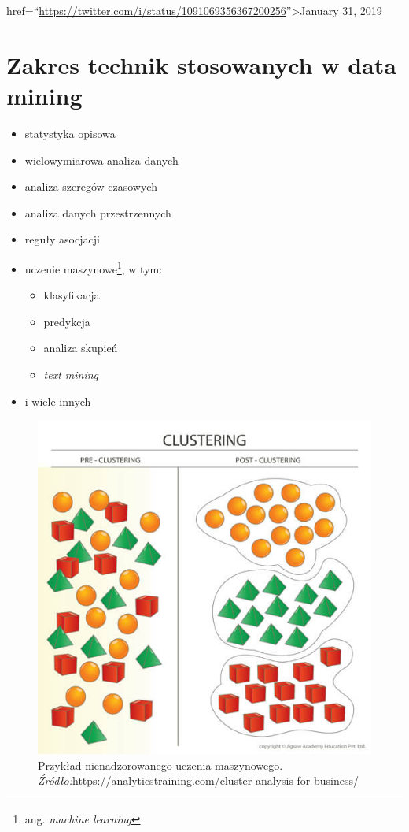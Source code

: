 \documentclass[]{book}
\providecommand{\tightlist}{%
  \setlength{\itemsep}{0pt}\setlength{\parskip}{0pt}}
\let\rmarkdownfootnote\footnote%
\def\footnote{\protect\rmarkdownfootnote}
\theoremstyle{plain}
\theoremstyle{definition}
\theoremstyle{definition}
\theoremstyle{definition}
\theoremstyle{definition}
\theoremstyle{remark}
\begin{document}
href=``\url{https://twitter.com/i/status/1091069356367200256}''\textgreater{}January 31, 2019

\hypertarget{zakres-technik-stosowanych-w-data-mining}{%
\section*{Zakres technik stosowanych w data mining}\label{zakres-technik-stosowanych-w-data-mining}}

\begin{itemize}
\tightlist
\item
  statystyka opisowa
\item
  wielowymiarowa analiza danych
\item
  analiza szeregów czasowych
\item
  analiza danych przestrzennych
\item
  reguły asocjacji
\item
  uczenie maszynowe\footnote{ang. \emph{machine learning}}, w tym:

  \begin{itemize}
  \tightlist
  \item
    klasyfikacja
  \item
    predykcja
  \item
    analiza skupień
  \item
    \emph{text mining}
  \end{itemize}
\item
  i wiele innych
\end{itemize}

\begin{figure}
\centering
\includegraphics{images/cluster1.jpg}
\caption{\label{fig:cluster1}Przykład nienadzorowanego uczenia maszynowego.~ \emph{Źródło:}\url{https://analyticstraining.com/cluster-analysis-for-business/}}
\end{figure}
\end{document}
